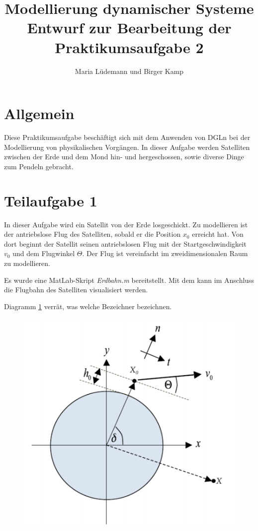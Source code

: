 \documentclass[]{scrartcl}
\title{Modellierung dynamischer Systeme  \\ Entwurf zur Bearbeitung der Praktikumsaufgabe 2}
\author{Maria Lüdemann und Birger Kamp}
\begin{document}
\maketitle

\begin{abstract}

\end{abstract}

\section{Allgemein}
Diese Praktikumsaufgabe beschäftigt sich mit dem Anwenden von DGLn bei der Modellierung von physikalischen Vorgängen. In dieser Aufgabe werden Satelliten zwischen der Erde und dem Mond hin- und hergeschossen, sowie diverse Dinge zum Pendeln gebracht.

\section{Teilaufgabe 1}
In dieser Aufgabe wird ein Satellit von der Erde losgeschickt. Zu modellieren ist der antriebslose Flug des Satelliten, sobald er die Position $x_{0}$ erreicht hat. Von dort beginnt der Satellit seinen antriebslosen Flug mit der Startgeschwindigkeit $v_{0}$ und dem Flugwinkel $\Theta$. Der Flug ist vereinfacht im zweidimensionalen Raum zu modellieren.

Es wurde eine MatLab-Skript \textit{Erdbahn.m} bereitstellt. Mit dem kann im Anschluss die Flugbahn des Satelliten visualisiert werden.

Diagramm \ref{fig:1_BezeichnerDiagramm} verrät, was welche Bezeichner bezeichnen.
\begin{figure}[htbp]
\centering
\includegraphics[width=1\linewidth]{./1_BezeichnerDiagramm}
\caption{}
\label{fig:1_BezeichnerDiagramm}
\end{figure}
\end{document}
